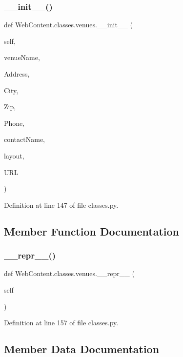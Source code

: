 \subsubsection{\texorpdfstring{\+\_\+\+\_\+init\+\_\+\+\_\+()}{\_\_init\_\_()}}
{\footnotesize\ttfamily def Web\+Content.\+classes.\+venues.\+\_\+\+\_\+init\+\_\+\+\_\+ (\begin{DoxyParamCaption}\item[{}]{self,  }\item[{}]{venue\+Name,  }\item[{}]{Address,  }\item[{}]{City,  }\item[{}]{Zip,  }\item[{}]{Phone,  }\item[{}]{contact\+Name,  }\item[{}]{layout,  }\item[{}]{U\+RL }\end{DoxyParamCaption})}



Definition at line 147 of file classes.\+py.



\subsection{Member Function Documentation}
\mbox{\label{class_web_content_1_1classes_1_1venues_a1c806e25e7eb1c18ba58a51817120f00}} 
\subsubsection{\texorpdfstring{\+\_\+\+\_\+repr\+\_\+\+\_\+()}{\_\_repr\_\_()}}
{\footnotesize\ttfamily def Web\+Content.\+classes.\+venues.\+\_\+\+\_\+repr\+\_\+\+\_\+ (\begin{DoxyParamCaption}\item[{}]{self }\end{DoxyParamCaption})}



Definition at line 157 of file classes.\+py.



\subsection{Member Data Documentation}
\mbox{\label{class_web_content_1_1classes_1_1venues_a5e482b9cf50927587cd0940be0a65eb4}} 
